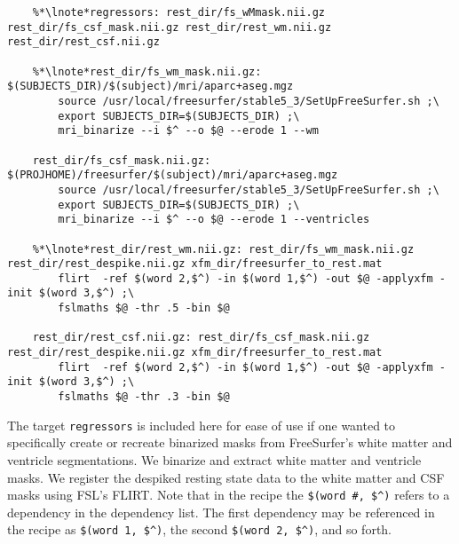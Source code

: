 \begin{lstlisting}
	%*\lnote*regressors: rest_dir/fs_wMmask.nii.gz rest_dir/fs_csf_mask.nii.gz rest_dir/rest_wm.nii.gz rest_dir/rest_csf.nii.gz

	%*\lnote*rest_dir/fs_wm_mask.nii.gz: $(SUBJECTS_DIR)/$(subject)/mri/aparc+aseg.mgz
		source /usr/local/freesurfer/stable5_3/SetUpFreeSurfer.sh ;\
		export SUBJECTS_DIR=$(SUBJECTS_DIR) ;\
		mri_binarize --i $^ --o $@ --erode 1 --wm

	rest_dir/fs_csf_mask.nii.gz: $(PROJHOME)/freesurfer/$(subject)/mri/aparc+aseg.mgz
		source /usr/local/freesurfer/stable5_3/SetUpFreeSurfer.sh ;\
		export SUBJECTS_DIR=$(SUBJECTS_DIR) ;\
		mri_binarize --i $^ --o $@ --erode 1 --ventricles
		
	%*\lnote*rest_dir/rest_wm.nii.gz: rest_dir/fs_wm_mask.nii.gz rest_dir/rest_despike.nii.gz xfm_dir/freesurfer_to_rest.mat
		flirt  -ref $(word 2,$^) -in $(word 1,$^) -out $@ -applyxfm -init $(word 3,$^) ;\	
		fslmaths $@ -thr .5 -bin $@

	rest_dir/rest_csf.nii.gz: rest_dir/fs_csf_mask.nii.gz rest_dir/rest_despike.nii.gz xfm_dir/freesurfer_to_rest.mat
		flirt  -ref $(word 2,$^) -in $(word 1,$^) -out $@ -applyxfm -init $(word 3,$^) ;\
		fslmaths $@ -thr .3 -bin $@
\end{lstlisting}

 The target \texttt{regressors} is included here for ease of use if one wanted to specifically create or recreate binarized masks from FreeSurfer's white matter and ventricle segmentations.  We binarize and extract white matter and ventricle masks.  We register the despiked resting state data to the white matter and CSF masks using  FSL's FLIRT.  Note that in the recipe the \texttt{\$(word \#, \$\^{})} refers to a dependency in the dependency list. The first dependency may be referenced in the recipe as \texttt{\$(word 1, \$\^{})}, the second \texttt{\$(word 2, \$\^{})}, and so forth.

